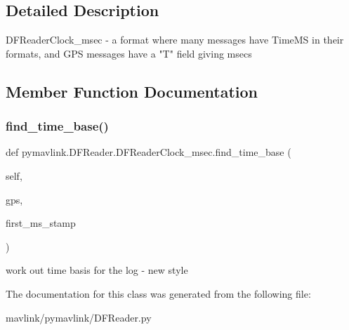 \subsection{Detailed Description}
\begin{DoxyVerb}DFReaderClock_msec - a format where many messages have TimeMS in their formats, and GPS messages have a "T" field giving msecs \end{DoxyVerb}
 

\subsection{Member Function Documentation}
\mbox{\label{classpymavlink_1_1DFReader_1_1DFReaderClock__msec_a175357de9e67b92d2977d9aab2a3fe1a}} 
\subsubsection{\texorpdfstring{find\+\_\+time\+\_\+base()}{find\_time\_base()}}
{\footnotesize\ttfamily def pymavlink.\+D\+F\+Reader.\+D\+F\+Reader\+Clock\+\_\+msec.\+find\+\_\+time\+\_\+base (\begin{DoxyParamCaption}\item[{}]{self,  }\item[{}]{gps,  }\item[{}]{first\+\_\+ms\+\_\+stamp }\end{DoxyParamCaption})}

\begin{DoxyVerb}work out time basis for the log - new style\end{DoxyVerb}
 

The documentation for this class was generated from the following file\+:\begin{DoxyCompactItemize}
\item 
mavlink/pymavlink/D\+F\+Reader.\+py\end{DoxyCompactItemize}
